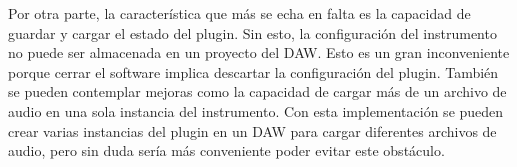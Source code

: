 \documentclass[12pt, a4paper, hidelinks]{report}
\begin{document}
	Por otra parte, la característica que más se echa en falta es la capacidad de guardar y cargar el estado del plugin.  Sin esto, la configuración del instrumento no puede ser almacenada en un proyecto del DAW. Esto es un gran inconveniente porque cerrar el software implica descartar la configuración del plugin. También se pueden contemplar mejoras como la capacidad de cargar más de un archivo de audio en una sola instancia del instrumento. Con esta implementación se pueden crear varias instancias del plugin en un DAW para cargar diferentes archivos de audio, pero sin duda sería más conveniente poder evitar este obstáculo.

	
	
	\newpage
	\printbibliography[heading=bibintoc]
	
\end{document}
